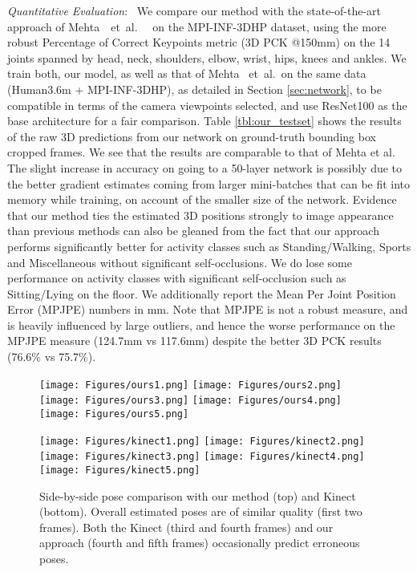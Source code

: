 \documentclass[acmtog]{acmart}
\newcommand{\parahead}[1]{\vspace{5pt}\noindent\emph{#1}:\ }
\newcommand{\etal}{~et~al.\ }
\newcommand{\change}[1]{{#1}}
\begin{document}
\parahead{Quantitative Evaluation}
\label{sec:quantitative}
We compare our method with the state-of-the-art approach of Mehta~\etal~ on the MPI-INF-3DHP dataset, using the more robust Percentage of Correct Keypoints metric (3D PCK @150mm) on the 14 joints spanned by head, neck, shoulders, elbow, wrist, hips, knees and ankles. We train both, our model, as well as that of Mehta \etal on the same data (Human3.6m + MPI-INF-3DHP), as detailed in Section \ref{sec:network}, to be compatible in terms of the camera viewpoints selected, and use ResNet100 as the base architecture for a fair comparison. Table \ref{tbl:our_testset} shows the results of the raw 3D predictions from our network on ground-truth bounding box cropped frames. We see that the results are comparable to that of Mehta et al. \change{The slight increase in accuracy on going to a 50-layer network is possibly due to the better gradient estimates coming from larger mini-batches that can be fit into memory while training, on account of the smaller size of the network.} Evidence that our method ties the estimated 3D positions strongly to image appearance than previous methods can also be gleaned from the fact that our approach performs significantly better for activity classes such as Standing/Walking, Sports and Miscellaneous without significant self-occlusions. We do lose some performance on activity classes with significant self-occlusion such as Sitting/Lying on the floor. We additionally report the Mean Per Joint Position Error (MPJPE) numbers in mm. Note that MPJPE is not a robust measure, and is heavily influenced by large outliers, and hence the \change{worse performance on} the MPJPE measure (124.7mm vs 117.6mm) \change{despite the better 3D PCK results (76.6\% vs 75.7\%).} 
\begin{figure}
\center
\texttt{[image: Figures/ours1.png]}
\texttt{[image: Figures/ours2.png]}
\texttt{[image: Figures/ours3.png]}
\texttt{[image: Figures/ours4.png]}
\texttt{[image: Figures/ours5.png]}

\vspace{0.05cm}
\texttt{[image: Figures/kinect1.png]}
\texttt{[image: Figures/kinect2.png]}
\texttt{[image: Figures/kinect3.png]}
\texttt{[image: Figures/kinect4.png]}
\texttt{[image: Figures/kinect5.png]}
\caption{Side-by-side pose comparison with our method (top) and Kinect (bottom). 
Overall estimated poses are of similar quality (first two frames). Both the Kinect (third and fourth frames) and our approach (fourth and fifth frames) occasionally predict erroneous poses.
}
\label{fig:livingroom_simple}
\end{figure}
\end{document}
